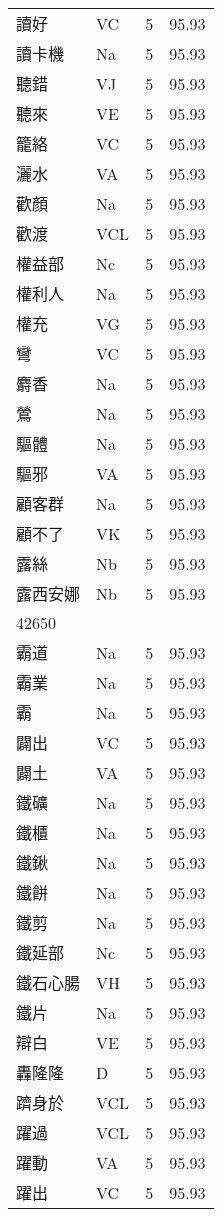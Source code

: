 \documentclass[twocolumn]{book}
\begin{document}
\begin{supertabular}{llrr}
讀好 & VC & 5 &  95.93\\
讀卡機 & Na & 5 &  95.93\\
聽錯 & VJ & 5 &  95.93\\
聽來 & VE & 5 &  95.93\\
籠絡 & VC & 5 &  95.93\\
灑水 & VA & 5 &  95.93\\
歡顏 & Na & 5 &  95.93\\
歡渡 & VCL & 5 &  95.93\\
權益部 & Nc & 5 &  95.93\\
權利人 & Na & 5 &  95.93\\
權充 & VG & 5 &  95.93\\
彎 & VC & 5 &  95.93\\
麝香 & Na & 5 &  95.93\\
鶯 & Na & 5 &  95.93\\
驅體 & Na & 5 &  95.93\\
驅邪 & VA & 5 &  95.93\\
顧客群 & Na & 5 &  95.93\\
顧不了 & VK & 5 &  95.93\\
露絲 & Nb & 5 &  95.93\\
露西安娜 & Nb & 5 &  95.93\\
42650\\
霸道 & Na & 5 &  95.93\\
霸業 & Na & 5 &  95.93\\
霸 & Na & 5 &  95.93\\
闢出 & VC & 5 &  95.93\\
闢土 & VA & 5 &  95.93\\
鐵礦 & Na & 5 &  95.93\\
鐵櫃 & Na & 5 &  95.93\\
鐵鍬 & Na & 5 &  95.93\\
鐵餅 & Na & 5 &  95.93\\
鐵剪 & Na & 5 &  95.93\\
鐵延部 & Nc & 5 &  95.93\\
鐵石心腸 & VH & 5 &  95.93\\
鐵片 & Na & 5 &  95.93\\
辯白 & VE & 5 &  95.93\\
轟隆隆 & D & 5 &  95.93\\
躋身於 & VCL & 5 &  95.93\\
躍過 & VCL & 5 &  95.93\\
躍動 & VA & 5 &  95.93\\
躍出 & VC & 5 &  95.93\\

\end{supertabular}
\end{document}
